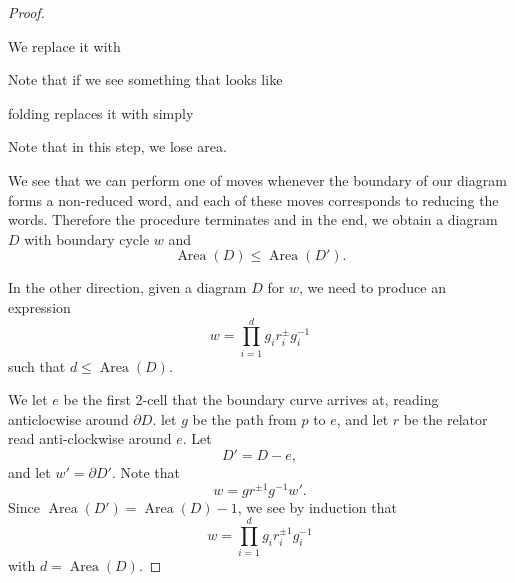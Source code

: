 \documentclass[a4paper]{article}
\DeclareMathOperator\Area{Area}
\begin{document}
\begin{proof}
\begin{itemize}
\begin{center}
      \end{center}
      We replace it with
      \begin{center}
      \end{center}
  \end{itemize}
  Note that if we see something that looks like
  \begin{center}
  \end{center}
  folding replaces it with simply
  \begin{center}
  \end{center}
  Note that in this step, we lose area.

  We see that we can perform one of moves whenever the boundary of our diagram forms a non-reduced word, and each of these moves corresponds to reducing the words. Therefore the procedure terminates and in the end, we obtain a diagram $D$ with boundary cycle $w$ and
  \[
    \Area(D) \leq \Area(D').
  \]

  In the other direction, given a diagram $D$ for $w$, we need to produce an expression
  \[
    w = \prod_{i = 1}^d g_i r_i^{\pm} g_i^{-1}
  \]
  such that $d \leq \Area(D)$.

  We let $e$ be the first $2$-cell that the boundary curve arrives at, reading anticlocwise around $\partial D$. let $g$ be the path from $p$ to $e$, and let $r$ be the relator read anti-clockwise around $e$. Let
  \[
    D' = D - e,
  \]
  and let $w' = \partial D'$. Note that
  \[
    w = gr^{\pm 1} g^{-1} w'.
  \]
  Since $\Area(D') = \Area(D) - 1$, we see by induction that
  \[
    w = \prod_{i = 1}^d g_i r_i^{\pm 1} g_i^{-1}
  \]
  with $d = \Area(D)$.
\end{proof}
\end{document}
